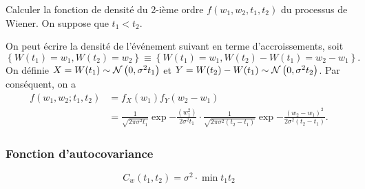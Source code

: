 \documentclass[11pt]{article}
\newcommand\Norm[2]{%
	\ensuremath{%
		\mathcal{N}\left(#1,#2\right)%
	}%
}%
\begin{document}
\begin{exemple}
	Calculer la fonction de densité du 2-ième ordre $f(w_1,w_2,t_1,t_2)$ du
	processus de Wiener. On suppose que $t_1<t_2$.

	On peut écrire la densité de l'événement suivant en terme d'accroissements,
	soit
	\begin{equation*}
		\left\{W(t_1)=w_1,W(t_2)=w_2\right\}
		\equiv\left\{W(t_1)=w_1,W(t_2)-W(t_1)=w_2-w_1\right\}.
	\end{equation*}
	On définie $X=W(t_1)\sim\Norm{0}{\sigma^2t_1}$ et $Y=W(t_2)-W(t_1)\sim
	\Norm{0}{\sigma^2t_2}$. Par conséquent, on a
	\begin{equation*}
		\begin{split}
			f(w_1,w_2;t_1,t_2)
			&=f_X(w_1)f_Y(w_2-w_1)\\
			&=\frac{1}{\sqrt{2\pi\sigma^2t_1}}\exp{-
				\frac{(w_1^2)}{2\sigma^2t_1}
			}\cdot\frac{1}{\sqrt{2\pi\sigma^2(t_2-t_1)}}\exp{-
				\frac{(w_2-w_1)^2}{2\sigma^2(t_2-t_1)}
			}.
		\end{split}
	\end{equation*}
\end{exemple}

\subsubsection{Fonction d'autocovariance}
\begin{equation*}
	C_w(t_1,t_2)=\sigma^2\cdot\min{t_1}{t_2}
\end{equation*}
\end{document}
